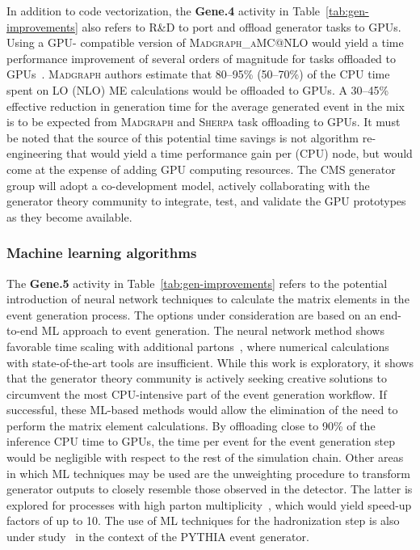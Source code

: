In addition to code vectorization, the \textbf{Gene.4} activity in Table~\ref{tab:gen-improvements} also refers to R\&D to port and offload generator tasks to \glspl{GPU}. Using a \gls{GPU}- compatible version of \textsc{Madgraph\_aMC@NLO} would yield a time performance improvement of several orders of magnitude for tasks offloaded to \glspl{GPU}~\cite{madgraph4gpu1, madgraph4gpu2, madgraph4gpu3}. \textsc{Madgraph} authors estimate that 80--95\% (50--70\%) of the \gls{CPU} time spent on \gls{LO} (\gls{NLO}) \gls{ME} calculations would be offloaded to \glspl{GPU}. A 30--45\% effective reduction in generation time for the average generated event in the \PhaseTwo mix is to be expected from \textsc{Madgraph} and \textsc{Sherpa} task offloading to \glspl{GPU}. It must be noted that the source of this potential time savings is not algorithm re-engineering that would yield a time performance gain per (\gls{CPU}) node, but would come at the expense of adding \gls{GPU} computing resources. The CMS generator group will adopt a co-development model, actively collaborating with the generator theory community to integrate, test, and validate the \gls{GPU} prototypes as they become available.

\subsubsection{Machine learning algorithms}

The \textbf{Gene.5} activity in Table~\ref{tab:gen-improvements} refers to the potential introduction of neural network techniques to calculate the matrix elements in the event generation process. The options under consideration are based on an end-to-end \gls{ML} approach to event generation. The neural network method shows favorable time scaling with additional partons~\cite{Moodie:2022flt, Aylett-Bullock:2021hmo}, where numerical calculations with state-of-the-art tools are insufficient. 
While this work is exploratory, it shows that the generator theory community is actively seeking creative solutions to circumvent the most \gls{CPU}-intensive part of the event generation workflow. If successful, these \gls{ML}-based methods would allow the elimination of the need to perform the matrix element calculations. By offloading close to 90\% of the inference \gls{CPU} time to \glspl{GPU}, the time per event for the event generation step would be negligible with respect to the rest of the simulation chain. 
Other areas in which \gls{ML} techniques may be used are the unweighting procedure to transform generator outputs to closely resemble those observed  in the detector. The latter is explored for processes with high parton multiplicity~\cite{gen5, Danziger:2021eeg}, which would yield speed-up factors of up to 10. The use of \gls{ML} techniques for the hadronization step is also under study~\cite{Ilten:2022jfm} in the context of the \textsc{PYTHIA} event generator.

